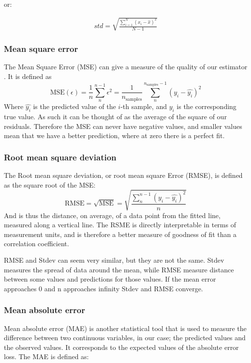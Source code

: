  or:

\begin{align}
std = \sqrt{\frac{\sum^N_{i=1} (x_i- \hat{x})^2}{N-1}}
\end{align}

\subsubsection{Mean square error} 
 
The Mean Square Error (\ac{MSE}) can give a measure of the quality of our estimator \cite{robert2014machine}. It is defined as
\begin{equation}\label{eq: mse}
	\text{MSE}(\epsilon) = \frac{1}{n}\sum_n^{n-1}\epsilon^2 = \frac{1}{n_\text{samples}} \sum_n^{n_{\text{samples}}-1}(y_i - \hat{y_i})^2
	\end{equation}
	Where $\hat{y_i}$ is the predicted value of the $i$-th sample, and $y_i$ is the corresponding true value.
As such it can be thought of  as the average of the square of our residuals. Therefore the MSE can never have negative values, and smaller values mean that we have a better prediction, where at zero there is a perfect fit.

\subsubsection{Root mean square deviation} 
The Root mean square deviation, or root mean square Error (\ac{RMSE}), is defined as the square root of the MSE:
$$\text{RMSE} = \sqrt{\text{MSE}} =  \sqrt{\frac{\sum^{n-1}_{n}(y_{i}-\hat{y_{i}})^2 }{n}} $$
And is thus the distance, on average, of a data point from the fitted line, measured along a vertical line. The RSME is directly interpretable in terms of measurement units, and is therefore a better measure of goodness of fit than a correlation coefficient. 

RMSE and Stdev can seem very similar, but they are not the same. Stdev measures the spread of data around the mean, while RMSE measure distance between some values and predictions for those values. If the mean error approaches $0$ and n approaches infinity Stdev and RMSE converge. 

\subsubsection{Mean absolute error}
Mean absolute error (\ac{MAE}) is another statistical tool that is used to measure the difference between two continuous variables, in our case; the predicted values and the observed values. It corresponds to the expected values of the absolute error loss. The MAE is defined as:

